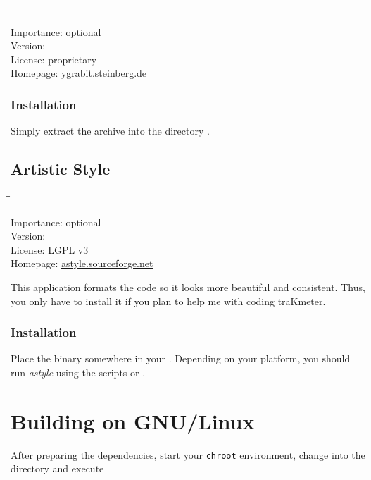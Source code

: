 \begin{tabbing}
  \hspace*{6em}\=\=\kill

  Importance:  \> optional \\
  Version:      \\
  License:     \> proprietary \\
  Homepage:    \> \href{http://ygrabit.steinberg.de/}{ygrabit.steinberg.de}
\end{tabbing}

\subsubsection{Installation}

Simply extract the archive into the directory
.

\subsection{Artistic Style}

\begin{tabbing}
  \hspace*{6em}\=\=\kill

  Importance:  \> optional \\
  Version:      \\
  License:     \> LGPL v3 \\
  Homepage:    \> \href{http://astyle.sourceforge.net/}{astyle.sourceforge.net}
\end{tabbing}

This application formats the code so it looks more beautiful and
consistent.  Thus, you only have to install it if you plan to help me
with coding traKmeter.

\subsubsection{Installation}

Place the binary somewhere in your .  Depending on your
platform, you should run \emph{astyle} using the scripts
 or .

\section{Building on GNU/Linux}

After preparing the dependencies, start your \texttt{chroot}
environment, change into the directory  and execute

